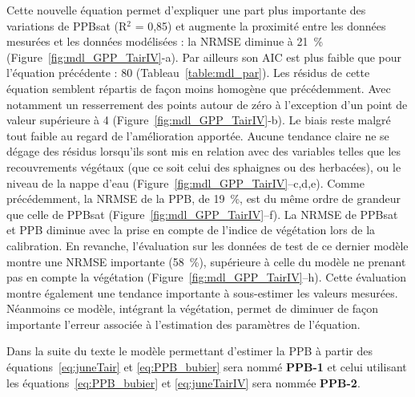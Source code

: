 Cette nouvelle équation permet d'expliquer une part plus importante des variations de PPBsat (R$^{2}$ = 0,85) et augmente la proximité entre les données mesurées et les données modélisées : la NRMSE diminue à \SI{21}{\percent} (Figure~\ref{fig:mdl_GPP_TairIV}-a).
Par ailleurs son AIC est plus faible que pour l'équation précédente : 80 (Tableau~\ref{table:mdl_par}).
Les résidus de cette équation semblent répartis de façon moins homogène que précédemment.
Avec notamment un resserrement des points autour de zéro à l'exception d'un point de valeur supérieure à \num{4} (Figure~\ref{fig:mdl_GPP_TairIV}-b).
Le biais reste malgré tout faible au regard de l'amélioration apportée.
Aucune tendance claire ne se dégage des résidus lorsqu'ils sont mis en relation avec des variables telles que les recouvrements végétaux (que ce soit celui des sphaignes ou des herbacées), ou le niveau de la nappe d'eau (Figure~\ref{fig:mdl_GPP_TairIV}--c,d,e).
Comme précédemment, la NRMSE de la PPB, de \SI{19}{\percent}, est du même ordre de grandeur que celle de PPBsat (Figure~\ref{fig:mdl_GPP_TairIV}--f).
La NRMSE de PPBsat et PPB diminue avec la prise en compte de l'indice de végétation lors de la calibration.
En revanche, l'évaluation sur les données de test de ce dernier modèle montre une NRMSE importante (\SI{58}{\percent}), supérieure à celle du modèle ne prenant pas en compte la végétation (Figure~\ref{fig:mdl_GPP_TairIV}--h).
Cette évaluation montre également une tendance importante à sous-estimer les valeurs mesurées.
Néanmoins ce modèle, intégrant la végétation, permet de diminuer de façon importante l'erreur associée à l'estimation des paramètres de l'équation.

Dans la suite du texte le modèle permettant d'estimer la PPB à partir des équations~\ref{eq:juneTair} et \ref{eq:PPB_bubier} sera nommé \textbf{PPB-1} et celui utilisant les équations~\ref{eq:PPB_bubier} et \ref{eq:juneTairIV} sera nommée \textbf{PPB-2}.


